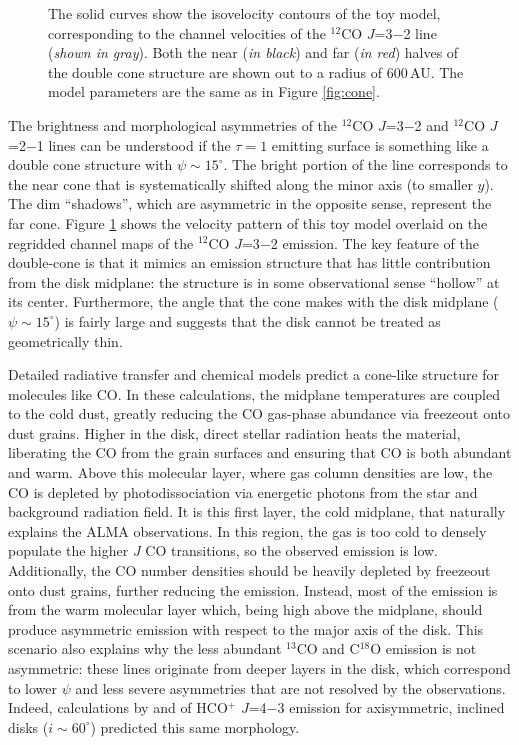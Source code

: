 \begin{figure}[t!]
\caption{The solid curves show the isovelocity contours of the toy model,
corresponding to the channel velocities of the $^{12}$CO $J$=3$-$2 line 
({\it shown in gray}).  Both the near ({\it in black}) and far ({\it in red})
halves of the double cone structure are shown out to a radius of 600\,AU.  The 
model parameters are the same as in Figure \ref{fig:cone}.
\label{fig:cone_chmaps}}
\end{figure}

The brightness and morphological asymmetries of the $^{12}$CO $J$=3$-$2 and 
$^{12}$CO $J$=2$-$1 lines can be understood if the $\tau=1$ emitting surface is 
something like a double cone structure with $\psi \sim 15^\circ$.  The bright 
portion of the line corresponds to the near cone that is systematically shifted 
along the minor axis (to smaller $y$).  The dim ``shadows'', which are 
asymmetric in the opposite sense, represent the far cone.  Figure 
\ref{fig:cone_chmaps} shows the velocity pattern of this toy model overlaid on 
the regridded channel maps of the $^{12}$CO $J$=3$-$2 emission.   The key 
feature of the double-cone is that it mimics an emission structure that has 
little contribution from the disk midplane: the structure is in some 
observational sense ``hollow'' at its center.  Furthermore, the angle that the
cone makes with the disk midplane ($\psi \sim 15^\circ$) is fairly large 
\citep[but not abnormally so;][]{vanzadelhoff01} and suggests that the disk 
cannot be treated as geometrically thin.

Detailed radiative transfer and chemical models 
\citep[][]{aikawa99,aikawa06,semenov11,walsh12} predict a cone-like structure 
for molecules like CO.  In these calculations, the midplane temperatures are 
coupled to the cold dust, greatly reducing the CO gas-phase abundance via 
freezeout onto dust grains.  Higher in the disk, direct stellar radiation heats 
the material, liberating the CO from the grain surfaces and ensuring that 
CO is both abundant and warm.  Above this molecular layer, where gas column 
densities are low, the CO is depleted by photodissociation via energetic photons
from the star and background radiation field.  It is this first layer, the cold 
midplane, that naturally explains the ALMA observations.  In this region, the 
gas is too cold to densely populate the higher $J$ CO transitions, so the 
observed emission is low.  Additionally, the CO number densities should be 
heavily depleted by freezeout onto dust grains, further reducing the emission.  
Instead, most of the emission is from the warm molecular layer which, being high
above the midplane, should produce asymmetric emission with respect to the major
axis of the disk.  This scenario also explains why the less abundant $^{13}$CO 
and C$^{18}$O emission is not asymmetric: these lines originate from deeper 
layers in the disk, which correspond to lower $\psi$ and less severe asymmetries
that are not resolved by the observations.  Indeed, calculations by 
\citet{pavlyuchenkov07} and \citet{semenov08} of HCO$^+$ $J$=4$-$3 emission for 
axisymmetric, inclined disks ($i\sim60^\circ$) predicted this same morphology.

